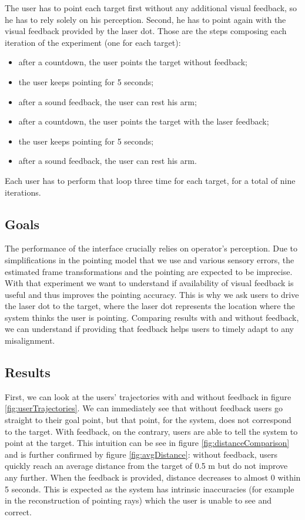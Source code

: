 The user has to point each target first without any additional visual feedback, so he has to rely solely on his perception. Second, he has to point again with the visual feedback provided by the laser dot. Those are the steps composing each iteration of the experiment (one for each target):
\begin{itemize}
    \item after a countdown, the user points the target without feedback;
    \item the user keeps pointing for 5 seconds;
    \item after a sound feedback, the user can rest his arm;
    \item after a countdown, the user points the target with the laser feedback;
    \item the user keeps pointing for 5 seconds;
    \item after a sound feedback, the user can rest his arm.
\end{itemize}
Each user has to perform that loop three time for each target, for a total of nine iterations.
\subsection{Goals}
The performance of the interface crucially relies on operator’s perception. Due to simplifications in the pointing model that we use and various sensory errors, the estimated frame transformations and the pointing are expected to be imprecise.\\
With that experiment we want to understand if availability of visual feedback is useful and thus improves the pointing accuracy. This is why we ask users to drive the laser dot to the target, where the laser dot represents the location where the system thinks the user is pointing. Comparing results with and without feedback, we can understand if providing that feedback helps users to timely adapt to any misalignment.

\subsection{Results}
First, we can look at the users' trajectories with and without feedback in figure \ref{fig:userTrajectories}. We can immediately see that without feedback users go straight to their goal point, but that point, for the system, does not correspond to the target. With feedback, on the contrary, users are able to tell the system to point at the target. This intuition can be see in figure \ref{fig:distanceComparison} and is further confirmed by figure \ref{fig:avgDistance}: without feedback, users quickly reach an average distance from the target of 0.5 m but do not improve any further. When the feedback is provided, distance decreases to almost 0 within 5 seconds. This is expected as the system has intrinsic inaccuracies (for example in the reconstruction of pointing rays) which the user is unable to see and correct. 

